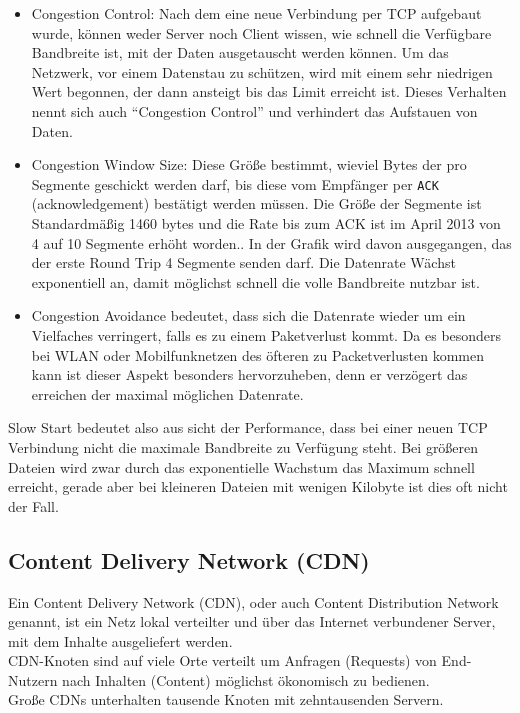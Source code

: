 		\begin{itemize}
			\item Congestion Control: Nach dem eine neue Verbindung per TCP aufgebaut wurde, können weder Server noch Client wissen, wie schnell die Verfügbare Bandbreite ist, mit der Daten ausgetauscht werden können. Um das Netzwerk, vor einem Datenstau zu schützen, wird mit einem sehr niedrigen Wert begonnen, der dann ansteigt bis das Limit erreicht ist. Dieses Verhalten nennt sich auch "`Congestion Control"' und verhindert das Aufstauen von Daten.
			\item Congestion Window Size: Diese Größe bestimmt, wieviel Bytes der pro Segmente geschickt werden darf, bis diese vom Empfänger per \texttt{ACK} (acknowledgement) bestätigt werden müssen. Die Größe der Segmente ist Standardmäßig 1460 bytes und die Rate bis zum ACK ist im April 2013 von 4 auf 10 Segmente erhöht worden.\autocite{grigorikSlowStart}. In der Grafik wird davon ausgegangen, das der erste Round Trip 4 Segmente senden darf. Die Datenrate Wächst exponentiell an, damit möglichst schnell die volle Bandbreite nutzbar ist.\\
			\item Congestion Avoidance bedeutet, dass sich die Datenrate wieder um ein Vielfaches verringert, falls es zu einem Paketverlust kommt. Da es besonders bei WLAN oder Mobilfunknetzen des öfteren zu Packetverlusten kommen kann ist dieser Aspekt besonders hervorzuheben, denn er verzögert das erreichen der maximal möglichen Datenrate.
		\end{itemize}

		Slow Start bedeutet also aus sicht der Performance, dass bei einer neuen TCP Verbindung nicht die maximale Bandbreite zu Verfügung steht. Bei größeren Dateien wird zwar durch das exponentielle Wachstum das Maximum schnell erreicht, gerade aber bei kleineren Dateien mit wenigen Kilobyte ist dies oft nicht der Fall.



	\subsection{Content Delivery Network (CDN)} %
	\label{sub:content_delivery_network}
		Ein Content Delivery Network (CDN), oder auch Content Distribution Network genannt, ist ein Netz lokal verteilter und über das Internet verbundener Server, mit dem Inhalte ausgeliefert werden.\\
		CDN-Knoten sind auf viele Orte verteilt um Anfragen (Requests) von End-Nutzern nach Inhalten (Content) möglichst ökonomisch zu bedienen.\\
		Große CDNs unterhalten tausende Knoten mit zehntausenden Servern.\autocite{wikipediaCDN}


